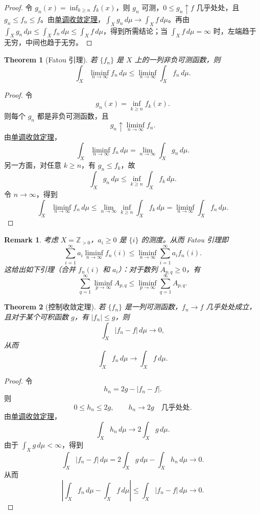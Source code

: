 \documentclass[12pt,letterpaper,twoside,openright]{ctexbook}
\theoremstyle{bluehead}
\newtheorem{theorem}{Theorem}
\theoremstyle{olivehead}
\theoremstyle{orangehead}
\theoremstyle{redremark}
\newtheorem*{remark}{Remark}
\begin{document}
\begin{proof}
令 $g_n(x)=\inf_{k\geq n}f_k(x)$，则 $g_n$ 可测，$0\leq g_n\uparrow f$ 几乎处处，且 $g_n\leq f_n\leq f$。由\hyperref[thm:monotone-convergence]{单调收敛定理}，$\int_X g_n\,d\mu\to\int_X f\,d\mu$。再由 $\int_X g_n\,d\mu\leq\int_X f_n\,d\mu\leq\int_X f\,d\mu$，得到所需结论；当 $\int_X f\,d\mu=\infty$ 时，左端趋于无穷，中间也趋于无穷。
\end{proof}




\begin{theorem}[Fatou 引理]
若 $\{f_n\}$ 是 $X$ 上的一列非负可测函数，则
\[
  \int_X\liminf_{n\to\infty}f_n\,d\mu
  \leq\liminf_{n\to\infty}\int_X f_n\,d\mu.
\]
\end{theorem}
\begin{proof}
令
\[
  g_n(x)=\inf_{k\geq n}f_k(x).
\]
则每个 $g_n$ 都是非负可测函数，且
\[
  g_n\uparrow\liminf_{n\to\infty}f_n.
\]
由\hyperref[thm:monotone-convergence]{单调收敛定理}，
\[
  \int_X\liminf_{n\to\infty}f_n\,d\mu
  =\lim_{n\to\infty}\int_X g_n\,d\mu.
\]
另一方面，对任意 $k\geq n$，有 $g_n\leq f_k$，故
\[
  \int_X g_n\,d\mu\leq\inf_{k\geq n}\int_X f_k\,d\mu.
\]
令 $n\to\infty$，得到
\[
  \int_X\liminf_{n\to\infty}f_n\,d\mu
  \leq\lim_{n\to\infty}\inf_{k\geq n}\int_X f_k\,d\mu
  =\liminf_{n\to\infty}\int_X f_n\,d\mu.
\]
\end{proof}
\begin{remark}
考虑 $X=\mathbb{Z}_{>0}$，$a_i\geq0$ 是 $\{i\}$ 的测度。从而 Fatou 引理即
\[
  \sum_{i=1}^{\infty}a_i\liminf_{n\to\infty}f_n(i)
  \leq\liminf_{n\to\infty}\sum_{i=1}^{\infty}a_i f_n(i).
\]
这给出如下引理（合并 $f_n(i)$ 和 $a_i$）：对于数列 $A_{p,q}\geq0$，有
\[
  \sum_{q=1}^{\infty}\liminf_{p\to\infty}A_{p,q}
  \leq\liminf_{p\to\infty}\sum_{q=1}^{\infty}A_{p,q}.
\]
\end{remark}

\begin{theorem}[控制收敛定理]\label{thm:dominated-convergence}
若 $\{f_n\}$ 是一列可测函数，$f_n\to f$ 几乎处处成立，且对于某个可积函数 $g$，有 $|f_n|\leq g$，则
\[
  \int_X|f_n-f|\,d\mu\longrightarrow0,
\]
从而
\[
  \int_X f_n\,d\mu\longrightarrow\int_X f\,d\mu.
\]
\end{theorem}
\begin{proof}
令
\[
  h_n=2g-|f_n-f|.
\]
则
\[
  0\leq h_n\leq2g,\qquad h_n\to2g\quad\text{几乎处处}.
\]
由\hyperref[thm:monotone-convergence]{单调收敛定理}，
\[
  \int_X h_n\,d\mu\longrightarrow2\int_X g\,d\mu.
\]
由于 $\int_X g\,d\mu<\infty$，得到
\[
  \int_X|f_n-f|\,d\mu
  =2\int_X g\,d\mu-\int_X h_n\,d\mu\longrightarrow0.
\]
从而
\[
  \left|\int_X f_n\,d\mu-\int_X f\,d\mu\right|
  \leq\int_X|f_n-f|\,d\mu\longrightarrow0.
\]
\end{proof}
\end{document}
